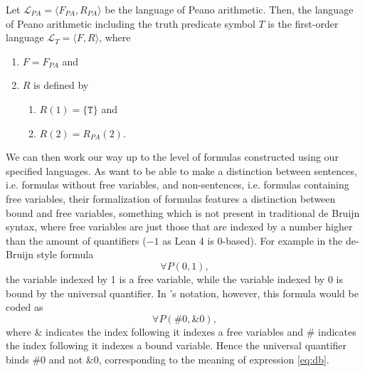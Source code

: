 \begin{definition}\label{def:lt}
    \leanok
    Let $\mathcal{L}_{PA} = \langle F_{PA},R_{PA}\rangle$ be the language of Peano arithmetic. Then, the language of Peano arithmetic including the truth predicate symbol $T$ is the first-order language $\mathcal{L}_T = \langle F, R \rangle$, where
    \begin{enumerate}
        \item $F = F_{PA}$ and
        \item $R$ is defined by
        \begin{enumerate}
            \item $R(1) = \{\texttt{T}\}$ and
            \item $R(2) = R_{PA}(2)$.
        \end{enumerate}
    \end{enumerate}
\end{definition}

We can then work our way up to the level of formulas constructed using our specified languages. As \cite{ffl} want to be able to make a distinction between sentences, i.e. formulas without free variables, and non-sentences, i.e. formulas containing free variables, their formalization of formulas features a distinction between bound and free variables, something which is not present in traditional de Bruijn syntax, where free variables are just those that are indexed by a number higher than the amount of quantifiers ($-1$ as Lean 4 is 0-based). For example in the de-Bruijn style formula 
\begin{equation}
\forall P(0,1),
\label{eq:db}
\end{equation}
the variable indexed by 1 is a free variable, while the variable indexed by 0 is bound by the universal quantifier. In \cite{ffl}'s notation, however, this formula would be coded as
\begin{equation}
\forall P(\#0,\&0),
\label{eq:ffl}
\end{equation}
where \& indicates the index following it indexes a free variables and \# indicates the index following it indexes a bound variable. Hence the universal quantifier binds \#0 and not \&0, corresponding to the meaning of expression \ref{eq:db}.

